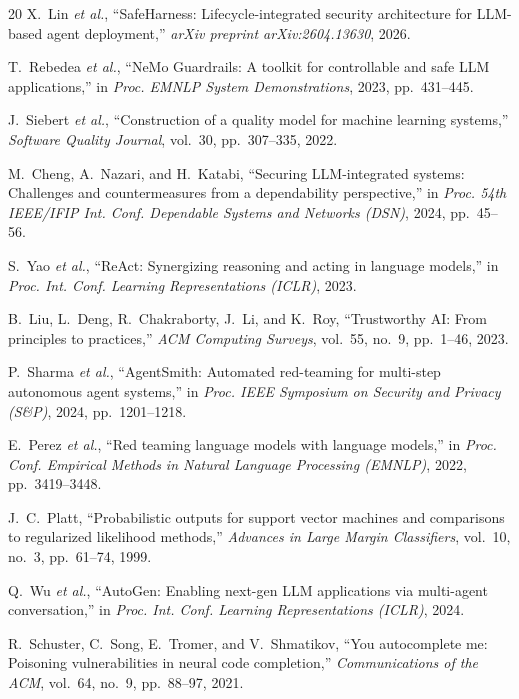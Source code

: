 \documentclass[conference]{IEEEtran}
\begin{document}
\begin{thebibliography}{20}
X.~Lin \textit{et al.}, ``SafeHarness: Lifecycle-integrated security architecture for LLM-based agent deployment,'' \textit{arXiv preprint arXiv:2604.13630}, 2026.

T.~Rebedea \textit{et al.}, ``NeMo Guardrails: A toolkit for controllable and safe LLM applications,'' in \textit{Proc. EMNLP System Demonstrations}, 2023, pp.~431--445.

J.~Siebert \textit{et al.}, ``Construction of a quality model for machine learning systems,'' \textit{Software Quality Journal}, vol.~30, pp.~307--335, 2022.

M.~Cheng, A.~Nazari, and H.~Katabi, ``Securing LLM-integrated systems: Challenges and countermeasures from a dependability perspective,'' in \textit{Proc. 54th IEEE/IFIP Int. Conf. Dependable Systems and Networks (DSN)}, 2024, pp.~45--56.

S.~Yao \textit{et al.}, ``ReAct: Synergizing reasoning and acting in language models,'' in \textit{Proc. Int. Conf. Learning Representations (ICLR)}, 2023.

B.~Liu, L.~Deng, R.~Chakraborty, J.~Li, and K.~Roy, ``Trustworthy AI: From principles to practices,'' \textit{ACM Computing Surveys}, vol.~55, no.~9, pp.~1--46, 2023.

P.~Sharma \textit{et al.}, ``AgentSmith: Automated red-teaming for multi-step autonomous agent systems,'' in \textit{Proc. IEEE Symposium on Security and Privacy (S\&P)}, 2024, pp.~1201--1218.

E.~Perez \textit{et al.}, ``Red teaming language models with language models,'' in \textit{Proc. Conf. Empirical Methods in Natural Language Processing (EMNLP)}, 2022, pp.~3419--3448.

J.~C.~Platt, ``Probabilistic outputs for support vector machines and comparisons to regularized likelihood methods,'' \textit{Advances in Large Margin Classifiers}, vol.~10, no.~3, pp.~61--74, 1999.

Q.~Wu \textit{et al.}, ``AutoGen: Enabling next-gen LLM applications via multi-agent conversation,'' in \textit{Proc. Int. Conf. Learning Representations (ICLR)}, 2024.

R.~Schuster, C.~Song, E.~Tromer, and V.~Shmatikov, ``You autocomplete me: Poisoning vulnerabilities in neural code completion,'' \textit{Communications of the ACM}, vol.~64, no.~9, pp.~88--97, 2021.

\end{thebibliography}
\end{document}
